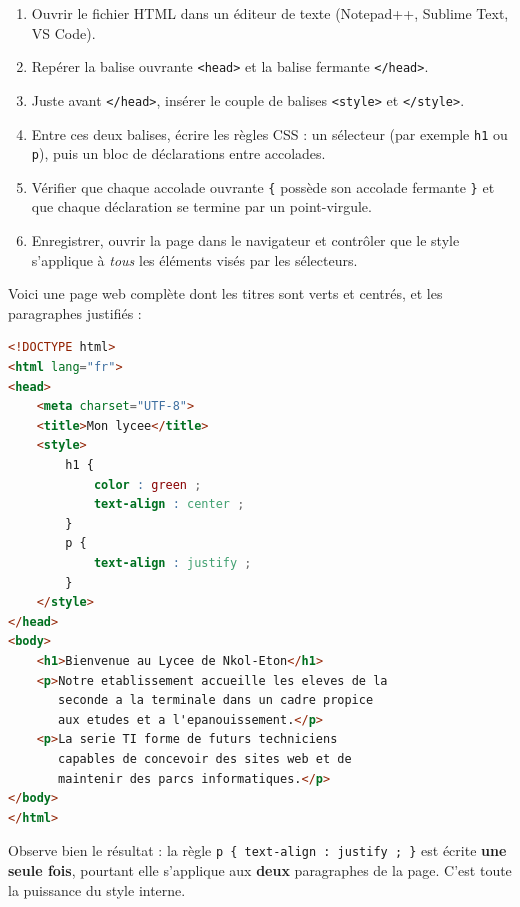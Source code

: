 \documentclass[11pt]{article}
\begin{document}
\begin{methode}
\begin{enumerate}
    \item Ouvrir le fichier HTML dans un éditeur de texte (Notepad++, Sublime Text, VS Code).
    \item Repérer la balise ouvrante \texttt{<head>} et la balise fermante \texttt{</head>}.
    \item Juste avant \texttt{</head>}, insérer le couple de balises \texttt{<style>} et \texttt{</style>}.
    \item Entre ces deux balises, écrire les règles CSS : un sélecteur (par exemple \texttt{h1} ou \texttt{p}), puis un bloc de déclarations entre accolades.
    \item Vérifier que chaque accolade ouvrante \texttt{\{} possède son accolade fermante \texttt{\}} et que chaque déclaration se termine par un point-virgule.
    \item Enregistrer, ouvrir la page dans le navigateur et contrôler que le style s'applique à \emph{tous} les éléments visés par les sélecteurs.
\end{enumerate}
\end{methode}

\begin{exemplebox}
Voici une page web complète dont les titres sont verts et centrés, et les paragraphes justifiés :
\begin{lstlisting}[language=HTML]
<!DOCTYPE html>
<html lang="fr">
<head>
    <meta charset="UTF-8">
    <title>Mon lycee</title>
    <style>
        h1 {
            color : green ;
            text-align : center ;
        }
        p {
            text-align : justify ;
        }
    </style>
</head>
<body>
    <h1>Bienvenue au Lycee de Nkol-Eton</h1>
    <p>Notre etablissement accueille les eleves de la
       seconde a la terminale dans un cadre propice
       aux etudes et a l'epanouissement.</p>
    <p>La serie TI forme de futurs techniciens
       capables de concevoir des sites web et de
       maintenir des parcs informatiques.</p>
</body>
</html>
\end{lstlisting}
Observe bien le résultat : la règle \texttt{p \{ text-align : justify ; \}} est écrite \textbf{une seule fois}, pourtant elle s'applique aux \textbf{deux} paragraphes de la page. C'est toute la puissance du style interne.
\end{exemplebox}
\end{document}

